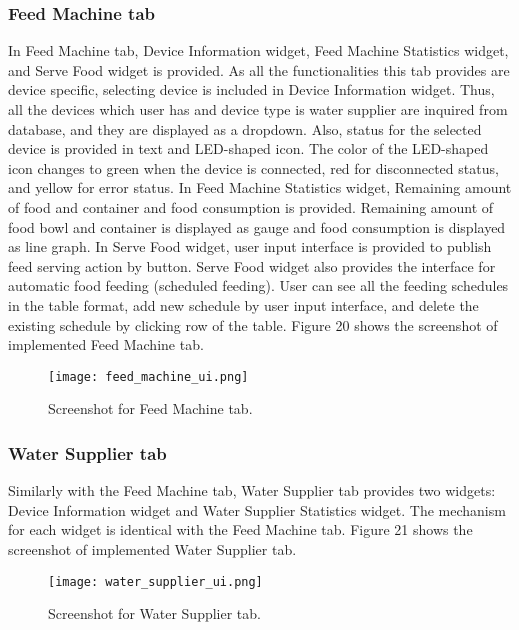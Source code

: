 \documentclass[conference]{IEEEtran}
\begin{document}
\subsubsection{Feed Machine tab}
In Feed Machine tab, Device Information widget, Feed Machine Statistics widget, and Serve Food widget is provided. As all the functionalities this tab provides are device specific, selecting device is included in Device Information widget. Thus, all the devices which user has and device type is water supplier are inquired from database, and they are displayed as a dropdown. Also, status for the selected device is provided in text and LED-shaped icon. The color of the LED-shaped icon changes to green when the device is connected, red for disconnected status, and yellow for error status. In Feed Machine Statistics widget, Remaining amount of food and container and food consumption is provided. Remaining amount of food bowl and container is displayed as gauge and food consumption is displayed as line graph. In Serve Food widget, user input interface is provided to publish feed serving action by button. Serve Food widget also provides the interface for automatic food feeding (scheduled feeding). User can see all the feeding schedules in the table format, add new schedule by user input interface, and delete the existing schedule by clicking row of the table. Figure 20
shows the screenshot of implemented Feed Machine tab.

\begin{figure}[htbp]
\centerline{\texttt{[image: feed\_machine\_ui.png]}}
\caption{Screenshot for Feed Machine tab.}
\label{fig}
\end{figure}

\subsubsection{Water Supplier tab}
Similarly with the Feed Machine tab, Water Supplier tab provides two widgets: Device Information widget and Water Supplier Statistics widget. The mechanism for each widget is identical with the Feed Machine tab. Figure 21
shows the screenshot of implemented Water Supplier tab.

\begin{figure}[htbp]
\centerline{\texttt{[image: water\_supplier\_ui.png]}}
\caption{Screenshot for Water Supplier tab.}
\label{fig}
\end{figure}
\end{document}
